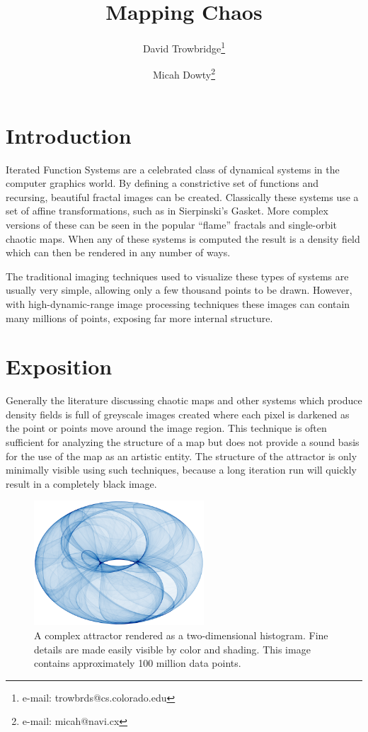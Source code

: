 \documentclass{acmsiggraph}
\title{Mapping Chaos}
\author{
  David Trowbridge\thanks{e-mail: trowbrds@cs.colorado.edu}
\and
  Micah Dowty\thanks{e-mail: micah@navi.cx}
}
\begin{document}
\maketitle

\section{Introduction}
\copyrightspace
Iterated Function Systems are a celebrated class of dynamical systems in the
computer graphics world. By defining a constrictive set of functions and
recursing, beautiful fractal images can be created. Classically these
systems use a set of affine transformations, such as in Sierpinski's Gasket.
More complex versions of these can be seen in the popular ``flame'' fractals
and single-orbit chaotic maps. When any of these systems is computed the
result is a density field which can then be rendered in any number of ways.

The traditional imaging techniques used to visualize these types of systems
are usually very simple, allowing only a few thousand points to be drawn.
However, with high-dynamic-range image processing techniques these images
can contain many millions of points, exposing far more internal structure.

\section{Exposition}
Generally the literature discussing chaotic maps and other systems which
produce density fields is full of greyscale images created where each pixel
is darkened as the point or points move around the image region. This
technique is often sufficient for analyzing the structure of a map but
does not provide a sound basis for the use of the map as an artistic entity.
The structure of the attractor is only minimally visible using such
techniques, because a long iteration run will quickly result in a
completely black image.

\begin{figure}[htb]
\centering
\includegraphics[width=2.5in]{1.png}
\caption{A complex attractor rendered as a two-dimensional histogram.
Fine details are made easily visible by color and shading. This image
contains approximately 100 million data points.}
\end{figure}
\end{document}
